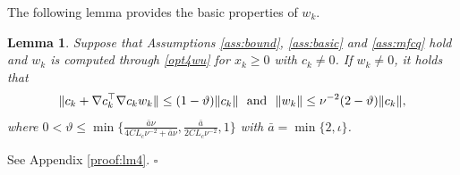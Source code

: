 \documentclass[11pt]{article}
\newenvironment{proof}{{\noindent\it Proof.}\quad}{\hfill $\square$\par}
\def\red#1{\textcolor{red}{#1}}
\newcommand{\R}{\mathbb{R}}
\newtheorem{lemma}{Lemma}
\begin{document}


The following lemma provides the basic properties of $w_k$.%
\begin{lemma}\label{lm:constraint_descent}
    Suppose that Assumptions \ref{ass:bound}, \ref{ass:basic} and \ref{ass:mfcq} hold and $w_k$ is computed through  \eqref{opt4wu} for   \(x_k \ge 0\) with $c_k\neq 0$. If $w_k\neq 0$,  it holds that  
    \begin{align*}
        \|c_k +\nabla c_k^\top \nabla c_k w_k\| \leq (1-{\vartheta})\|c_k\|~~{\rm and}~~\|w_k\|\leq \nu^{-2}(2-\vartheta)\|c_k\|,
    \end{align*}
    where \(0 <\vartheta \leq \min \{\frac{\bar a \nu}{4CL_c\nu^{-2}+\bar a \nu}, \frac{\bar a}{2CL_c\nu^{-2}}, 1\}\)  with \(\bar a = \min \{2,\iota\}\).
\end{lemma}
\begin{proof}
    See  Appendix \ref{proof:lm4}.
\end{proof}
\end{document}

